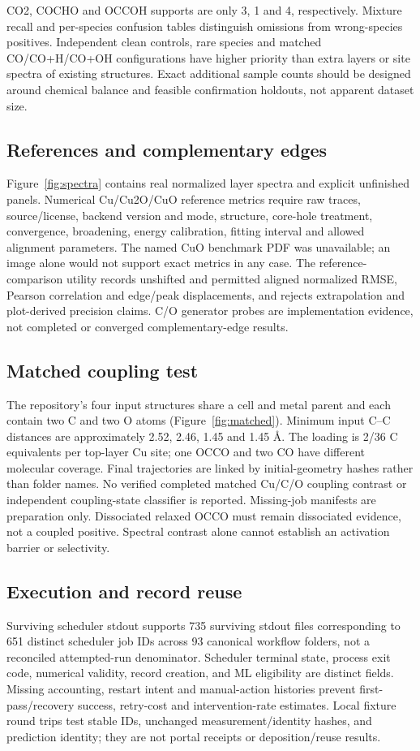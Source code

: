 \documentclass[11pt]{article}
\begin{document}
CO2, COCHO and OCCOH supports are only 3, 1 and 4, respectively. Mixture recall and per-species confusion tables distinguish omissions from wrong-species positives. Independent clean controls, rare species and matched CO/CO+H/CO+OH configurations have higher priority than extra layers or site spectra of existing structures. Exact additional sample counts should be designed around chemical balance and feasible confirmation holdouts, not apparent dataset size.

\subsection{References and complementary edges}
Figure~\ref{fig:spectra} contains real normalized layer spectra and explicit unfinished panels. Numerical Cu/Cu2O/CuO reference metrics require raw traces, source/license, backend version and mode, structure, core-hole treatment, convergence, broadening, energy calibration, fitting interval and allowed alignment parameters. The named CuO benchmark PDF was unavailable; an image alone would not support exact metrics in any case. The reference-comparison utility records unshifted and permitted aligned normalized RMSE, Pearson correlation and edge/peak displacements, and rejects extrapolation and plot-derived precision claims. C/O generator probes are implementation evidence, not completed or converged complementary-edge results.

\subsection{Matched coupling test}
The repository's four input structures share a cell and metal parent and each contain two C and two O atoms (Figure~\ref{fig:matched}). Minimum input C--C distances are approximately 2.52, 2.46, 1.45 and 1.45 \AA. The loading is 2/36 C equivalents per top-layer Cu site; one OCCO and two CO have different molecular coverage. Final trajectories are linked by initial-geometry hashes rather than folder names. No verified completed matched Cu/C/O coupling contrast or independent coupling-state classifier is reported. Missing-job manifests are preparation only. Dissociated relaxed OCCO must remain dissociated evidence, not a coupled positive. Spectral contrast alone cannot establish an activation barrier or selectivity.

\subsection{Execution and record reuse}
Surviving scheduler stdout supports 735 surviving stdout files corresponding to 651 distinct scheduler job IDs across 93 canonical workflow folders, not a reconciled attempted-run denominator. Scheduler terminal state, process exit code, numerical validity, record creation, and ML eligibility are distinct fields. Missing accounting, restart intent and manual-action histories prevent first-pass/recovery success, retry-cost and intervention-rate estimates. Local fixture round trips test stable IDs, unchanged measurement/identity hashes, and prediction identity; they are not portal receipts or deposition/reuse results.
\end{document}
